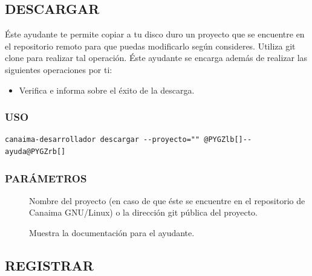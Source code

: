 \documentclass[letterpaper,12pt,spanish]{manual}
\begin{document}
\subsection{\textbf{DESCARGAR}}

Éste ayudante te permite copiar a tu disco duro un proyecto que se encuentre en el repositorio remoto para que puedas modificarlo según consideres. Utiliza git clone para realizar tal operación. Éste ayudante se encarga además de realizar las siguientes operaciones por ti:
\begin{itemize}
\item {} 
Verifica e informa sobre el éxito de la descarga.

\end{itemize}


\subsubsection{USO}

\begin{Verbatim}[commandchars=@\[\]]
canaima-desarrollador descargar --proyecto="" @PYGZlb[]--ayuda@PYGZrb[]
\end{Verbatim}


\subsubsection{PARÁMETROS}
\begin{description}
\item[{}] \leavevmode
Nombre del proyecto (en caso de que éste se encuentre en el repositorio de Canaima GNU/Linux) o la dirección git pública del proyecto.

\item[{}] \leavevmode
Muestra la documentación para el ayudante.

\end{description}


\subsection{\textbf{REGISTRAR}}
\end{document}
